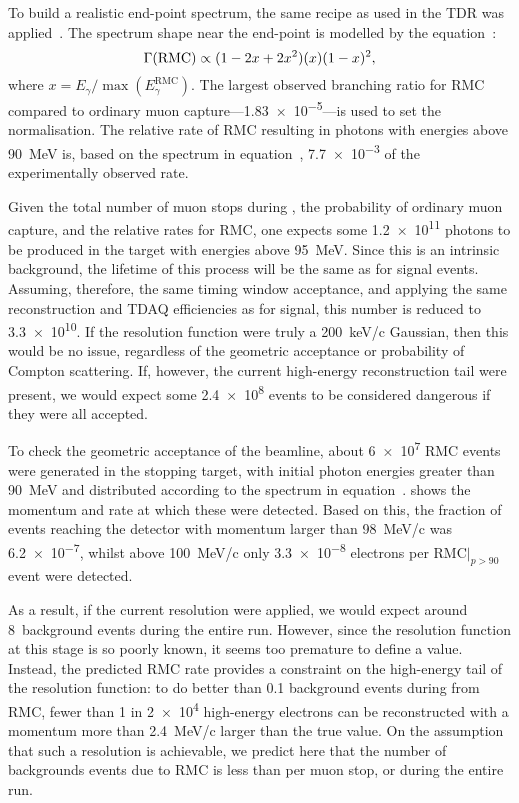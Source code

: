 To build a realistic end-point spectrum, the same recipe as used in the \phaseI TDR was applied~\cite{TDR2016}.
The spectrum shape near the end-point is modelled by the equation~\cite{CHRISTILLIN1980331}:
\begin{equation}
	\eqlabel{bg:rmc:spect}
	\Gamma(\textrm{RMC})\propto(1-2x+2x^2)(x)(1-x)^2,
\end{equation}
where $x=E_\gamma/\max(E_\gamma^\textrm{RMC})$.
The largest observed branching ratio for \ac{RMC} compared to ordinary muon capture---\num{1.83e-5}---is used to set the normalisation.
The relative rate of \ac{RMC} resulting in photons with energies above 90~MeV is, based on the spectrum in equation~, \num{7.7e-3} of the experimentally observed rate.
\FigRMCSimResults

Given the total number of muon stops during \phaseII, the probability of ordinary muon capture, and the relative rates for \ac{RMC}, one expects some \num{1.2e11} photons to be produced in the target with energies above 95~MeV.
Since this is an intrinsic background, the lifetime of this process will be the same as for signal events. 
Assuming, therefore, the same timing window acceptance, and applying the same reconstruction and TDAQ efficiencies as for signal, this number is reduced to \num{3.3e10}.
If the resolution function were truly a 200~keV/c Gaussian, then this would be no issue, regardless of the geometric acceptance or probability of Compton scattering.
If, however, the current \phaseI high-energy reconstruction tail were present, we would expect some \num{2.4e8} events to be considered dangerous if they were all accepted.

To check the geometric acceptance of the beamline, about \num{6e7} RMC events were generated in the stopping target, with initial photon energies greater than 90~MeV and distributed according to the spectrum in equation~.
 shows the momentum and rate at which these were detected.
Based on this, the fraction of events reaching the detector with momentum larger than 98~MeV/c was \num{6.2e-7}, whilst above 100~MeV/c only \num{3.3e-8} electrons per \ac{RMC}$|_{p>90}$ event were detected.

As a result, if the current \phaseI resolution were applied, we would expect around 8~background events during the entire run.
However, since the resolution function at this stage is so poorly known, it seems too premature to define a value.
Instead, the predicted RMC rate provides a constraint on the high-energy tail of the resolution function: to do better than 0.1 background events during \phaseII from RMC, fewer than 1 in \num{2e4} high-energy electrons can be reconstructed with a momentum more than 2.4~MeV/c larger than the true value.
On the assumption that such a resolution is achievable, we predict here that the number of backgrounds events due to RMC is less than \VarRMCPerMuStop per muon stop, or \VarRMCTotal during the entire \phaseII run.

